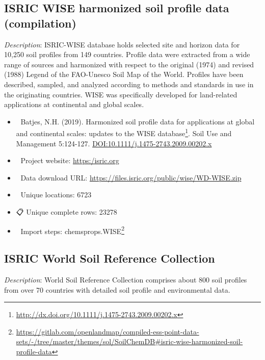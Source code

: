\documentclass[
  graybox,natbib,nospthms]{svmono}
\providecommand{\tightlist}{%
  \setlength{\itemsep}{0pt}\setlength{\parskip}{0pt}}
\providecommand{\tightlist}{\setlength{\itemsep}{0pt}\setlength{\parskip}{0pt}}
\renewcommand{\href}[2]{#2 (\url{#1})}
\renewcommand{\href}[2]{#2\footnote{\url{#1}}}
\begin{document}
\hypertarget{isric-wise-harmonized-soil-profile-data-compilation}{%
\subsection{ISRIC WISE harmonized soil profile data (compilation)}\label{isric-wise-harmonized-soil-profile-data-compilation}}

\emph{Description}: ISRIC-WISE database holds selected site and horizon data for 10,250 soil profiles from 149 countries. Profile data were extracted from a wide range of sources and harmonized with respect to the original (1974) and revised (1988) Legend of the FAO-Unesco Soil Map of the World. Profiles have been described, sampled, and analyzed according to methods and standards in use in the originating countries. WISE was specifically developed for land-related applications at continental and global scales.

\begin{itemize}
\tightlist
\item
  📕 Batjes, N.H. (2019). \href{http://dx.doi.org/10.1111/j.1475-2743.2009.00202.x}{Harmonized soil profile data for applications at global and continental scales: updates to the WISE database}. Soil Use and Management 5:124-127. \url{DOI:10.1111/j.1475-2743.2009.00202.x}\\
\item
  🔗 Project website: \url{https:/isric.org}\\
\item
  📂 Data download URL: \url{https://files.isric.org/public/wise/WD-WISE.zip}\\
\item
  📍 Unique locations: 6723\\
\item
  📋 Unique complete rows: 23278\\
\item
  📝 Import steps: \href{https://gitlab.com/openlandmap/compiled-ess-point-data-sets/-/tree/master/themes/sol/SoilChemDB\#isric-wise-harmonized-soil-profile-data}{chemsprops.WISE}
\end{itemize}

\hypertarget{isric-world-soil-reference-collection}{%
\subsection{ISRIC World Soil Reference Collection}\label{isric-world-soil-reference-collection}}

\emph{Description}: World Soil Reference Collection comprises about 800 soil profiles
from over 70 countries with detailed soil profile and environmental data.
\end{document}
